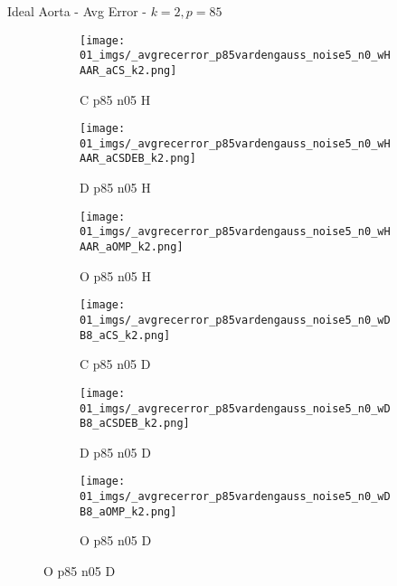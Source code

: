 \begin{frame}{Ideal Aorta - Avg Error - $k=2,p=85$}{}
\begin{figure}
\begin{subfigure}{0.13\textwidth}
\texttt{[image: 01\_imgs/\_avgrecerror\_p85vardengauss\_noise5\_n0\_wHAAR\_aCS\_k2.png]}
\caption*{\tiny C p85 n05 H}
\end{subfigure}
\begin{subfigure}{0.13\textwidth}
\texttt{[image: 01\_imgs/\_avgrecerror\_p85vardengauss\_noise5\_n0\_wHAAR\_aCSDEB\_k2.png]}
\caption*{\tiny D p85 n05 H}
\end{subfigure}
\begin{subfigure}{0.13\textwidth}
\texttt{[image: 01\_imgs/\_avgrecerror\_p85vardengauss\_noise5\_n0\_wHAAR\_aOMP\_k2.png]}
\caption*{\tiny O p85 n05 H}
\end{subfigure}
\begin{subfigure}{0.13\textwidth}
\texttt{[image: 01\_imgs/\_avgrecerror\_p85vardengauss\_noise5\_n0\_wDB8\_aCS\_k2.png]}
\caption*{\tiny C p85 n05 D}
\end{subfigure}
\begin{subfigure}{0.13\textwidth}
\texttt{[image: 01\_imgs/\_avgrecerror\_p85vardengauss\_noise5\_n0\_wDB8\_aCSDEB\_k2.png]}
\caption*{\tiny D p85 n05 D}
\end{subfigure}
\begin{subfigure}{0.13\textwidth}
\texttt{[image: 01\_imgs/\_avgrecerror\_p85vardengauss\_noise5\_n0\_wDB8\_aOMP\_k2.png]}
\caption*{\tiny O p85 n05 D}
\end{subfigure}

\vspace{5pt}


\end{figure}
\end{frame}
